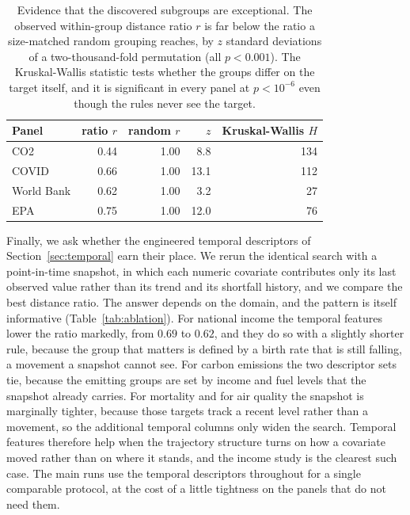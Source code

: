 \begin{table}[t]
\centering
\small
\begin{tabular}{@{}l r r r r@{}}
\toprule
Panel & ratio $r$ & random $r$ & $z$ & Kruskal-Wallis $H$ \\
\midrule
CO2        & 0.44 & 1.00 & 8.8  & 134 \\
COVID      & 0.66 & 1.00 & 13.1 & 112 \\
World Bank & 0.62 & 1.00 & 3.2  & 27 \\
EPA        & 0.75 & 1.00 & 12.0 & 76 \\
\bottomrule
\end{tabular}
\caption{Evidence that the discovered subgroups are exceptional. The observed within-group distance ratio $r$ is far below the ratio a size-matched random grouping reaches, by $z$ standard deviations of a two-thousand-fold permutation (all $p < 0.001$). The Kruskal-Wallis statistic tests whether the groups differ on the target itself, and it is significant in every panel at $p < 10^{-6}$ even though the rules never see the target.}
\label{tab:validation}
\end{table}

Finally, we ask whether the engineered temporal descriptors of Section~\ref{sec:temporal} earn their place. We rerun the identical search with a point-in-time snapshot, in which each numeric covariate contributes only its last observed value rather than its trend and its shortfall history, and we compare the best distance ratio. The answer depends on the domain, and the pattern is itself informative (Table~\ref{tab:ablation}). For national income the temporal features lower the ratio markedly, from $0.69$ to $0.62$, and they do so with a slightly shorter rule, because the group that matters is defined by a birth rate that is still falling, a movement a snapshot cannot see. For carbon emissions the two descriptor sets tie, because the emitting groups are set by income and fuel levels that the snapshot already carries. For mortality and for air quality the snapshot is marginally tighter, because those targets track a recent level rather than a movement, so the additional temporal columns only widen the search. Temporal features therefore help when the trajectory structure turns on how a covariate moved rather than on where it stands, and the income study is the clearest such case. The main runs use the temporal descriptors throughout for a single comparable protocol, at the cost of a little tightness on the panels that do not need them.

